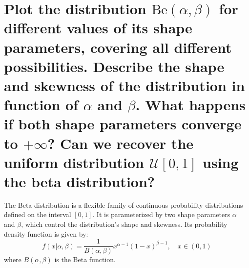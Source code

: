 \newpage

\section{Plot the distribution $\text{Be}(\alpha, \beta)$ for different values of its shape parameters, covering all different possibilities. Describe the shape and skewness of the distribution in function of $\alpha$ and $\beta$. What happens if both shape parameters converge to $+\infty$? Can we recover the uniform distribution $\mathcal{U}[0, 1]$ using the beta distribution?}

The Beta distribution is a flexible family of continuous probability distributions defined on the interval $[0, 1]$. It is parameterized by two shape parameters $\alpha$ and $\beta$, which control the distribution's shape and skewness. Its probability density function is given by:
\begin{equation}
f(x|\alpha, \beta) = \frac{1}{B(\alpha, \beta)} x^{\alpha - 1}(1 - x)^{\beta - 1}, \quad x \in (0, 1)
\end{equation}
where $B(\alpha, \beta)$ is the Beta function.

